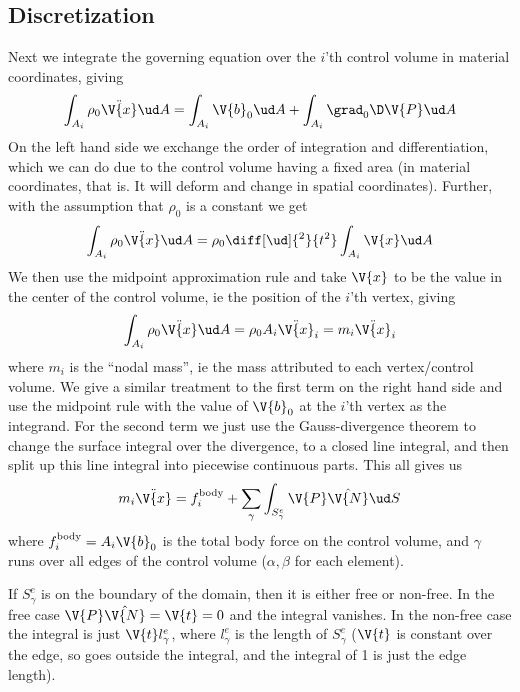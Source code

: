 \documentclass[sigconf]{acmart}
\begin{document}
\subsection{Discretization}
Next we integrate the governing equation over the $ i $'th control volume in material coordinates, giving
\begin{equation}\label{key}
	\int_{A_i} \rho_0 \ddot{\V{x}} \ud A = \int_{A_i} \V{b}_0 \ud A + \int_{A_i} \grad_0 \D \V{P} \ud A
\end{equation}
On the left hand side we exchange the order of integration and differentiation, which we can do due to the control volume having a fixed area (in material coordinates, that is. It will deform and change in spatial coordinates). Further, with the assumption that $ \rho_0 $ is a constant we get
\begin{equation}\label{key}
	\int_{A_i} \rho_0 \ddot{\V{x}} \ud A = \rho_0 \diff[\ud]{^2}{t^2}\int_{A_i} \V{x} \ud A
\end{equation}
We then use the midpoint approximation rule and take $ \V{x} $ to be the value in the center of the control volume, ie the position of the $ i $'th vertex, giving
\begin{equation}\label{key}
	\int_{A_i} \rho_0 \ddot{\V{x}} \ud A = \rho_0 A_i \ddot{\V{x}}_i = m_i \ddot{\V{x}}_i
\end{equation}
where $ m_i $ is the ``nodal mass'', ie the mass attributed to each vertex/control volume. We give a similar treatment to the first term on the right hand side and use the midpoint rule with the value of $ \V{b}_0 $ at the $ i $'th vertex as the integrand. For the second term we just use the Gauss-divergence theorem to change the surface integral over the divergence, to a closed line integral, and then split up this line integral into piecewise continuous parts. This all gives us
\begin{equation}\label{key}
	m_i \ddot{\V{x}} = f_i^{\text{body}} + \sum_{\gamma} \int_{S^e_{\gamma}}\V{P}\hat{\V{N}} \ud S
\end{equation}
where $ f_i^{\text{body}} =A_i\V{b}_0$ is the total body force on the control volume, and $ \gamma $ runs over all edges of the control volume ($ \alpha, \beta$ for each element).

If $ S^e_{\gamma} $ is on the boundary of the domain, then it is either free or non-free. In the free case $ \V{P}\hat{\V{N}} =\V{t}=0$ and the integral vanishes. In the non-free case the integral is just $ \V{t}l^e_{\gamma}$, where $ l^e_{\gamma} $ is the length of $ S^e_{\gamma} $ ($ \V{t} $ is constant over the edge, so goes outside the integral, and the integral of 1 is just the edge length).
\end{document}
